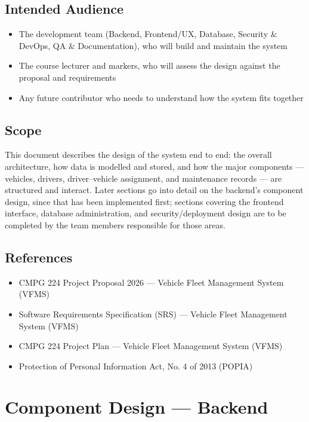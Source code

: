 \documentclass[11pt,a4paper]{article}
\begin{document}
\subsection{Intended Audience}
\begin{itemize}
    \item The development team (Backend, Frontend/UX, Database, Security \& DevOps, QA \& Documentation), who will build and maintain the system
    \item The course lecturer and markers, who will assess the design against the proposal and requirements
    \item Any future contributor who needs to understand how the system fits together
\end{itemize}

\subsection{Scope}
This document describes the design of the system end to end: the overall architecture, how data is modelled and stored, and how the major components --- vehicles, drivers, driver--vehicle assignment, and maintenance records --- are structured and interact. Later sections go into detail on the backend's component design, since that has been implemented first; sections covering the frontend interface, database administration, and security/deployment design are to be completed by the team members responsible for those areas.

\subsection{References}
\begin{itemize}
    \item CMPG 224 Project Proposal 2026 --- Vehicle Fleet Management System (VFMS)
    \item Software Requirements Specification (SRS) --- Vehicle Fleet Management System (VFMS)
    \item CMPG 224 Project Plan --- Vehicle Fleet Management System (VFMS)
    \item Protection of Personal Information Act, No. 4 of 2013 (POPIA)
\end{itemize}

\section{Component Design --- Backend}
\end{document}
